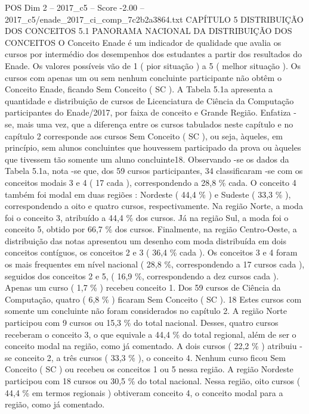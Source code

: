 \begin{textsample}{POS Dim 2 – 2017\_c5 – Score -2.00 – 2017\_c5/enade\_2017\_ci\_comp\_7c2b2a3864.txt}  \label{ex:f2_pos_391}
CAPÍTULO 5 DISTRIBUIÇÃO DOS CONCEITOS 5.1 PANORAMA NACIONAL DA DISTRIBUIÇÃO DOS CONCEITOS O Conceito Enade é um indicador de qualidade que avalia os cursos por intermédio dos desempenhos dos estudantes a partir dos resultados do Enade.
Os valores possíveis vão de 1 ( pior situação ) a 5 ( melhor situação ).
Os cursos com apenas um ou sem nenhum concluinte participante não obtêm o Conceito Enade, ficando Sem Conceito ( SC ).
A Tabela 5.1a apresenta a quantidade e distribuição de cursos de Licenciatura de Ciência da Computação participantes do Enade/2017, por faixa de conceito e Grande Região.
Enfatiza -se, mais uma vez, que a diferença entre os cursos tabulados neste capítulo e no capítulo 2 corresponde aos cursos Sem Conceito ( SC ), ou seja, àqueles, em princípio, sem alunos concluintes que houvessem participado da prova ou àqueles que tivessem tão somente um aluno concluinte18.
Observando -se os dados da Tabela 5.1a, nota -se que, dos 59 cursos participantes, 34 classificaram -se com os conceitos modais 3 e 4 ( 17 cada ), correspondendo a 28,8 \% cada.
O conceito 4 também foi modal em duas regiões : Nordeste ( 44,4 \% ) e Sudeste ( 33,3 \% ), correspondendo a oito e quatro cursos, respectivamente.
Na região Norte, a moda foi o conceito 3, atribuído a 44,4 \% dos cursos.
Já na região Sul, a moda foi o conceito 5, obtido por 66,7 \% dos cursos.
Finalmente, na região Centro-Oeste, a distribuição das notas apresentou um desenho com moda distribuída em dois conceitos contíguos, os conceitos 2 e 3 ( 36,4 \% cada ).
Os conceitos 3 e 4 foram os mais frequentes em nível nacional ( 28,8 \%, correspondendo a 17 cursos cada ), seguidos dos conceitos 2 e 5, ( 16,9 \%, correspondendo a dez cursos cada ).
Apenas um curso ( 1,7 \% ) recebeu conceito 1.
Dos 59 cursos de Ciência da Computação, quatro ( 6,8 \% ) ficaram Sem Conceito ( SC ). 18 Estes cursos com somente um concluinte não foram considerados no capítulo 2.
A região Norte participou com 9 cursos ou 15,3 \% do total nacional.
Desses, quatro cursos receberam o conceito 3, o que equivale a 44,4 \% do total regional, além de ser o conceito modal na região, como já comentado.
A dois cursos ( 22,2 \% ) atribuiu -se conceito 2, a três cursos ( 33,3 \% ), o conceito 4.
Nenhum curso ficou Sem Conceito ( SC ) ou recebeu os conceitos 1 ou 5 nessa região.
A região Nordeste participou com 18 cursos ou 30,5 \% do total nacional.
Nessa região, oito cursos ( 44,4 \% em termos regionais ) obtiveram conceito 4, o conceito modal para a região, como já comentado.

\end{textsample}
